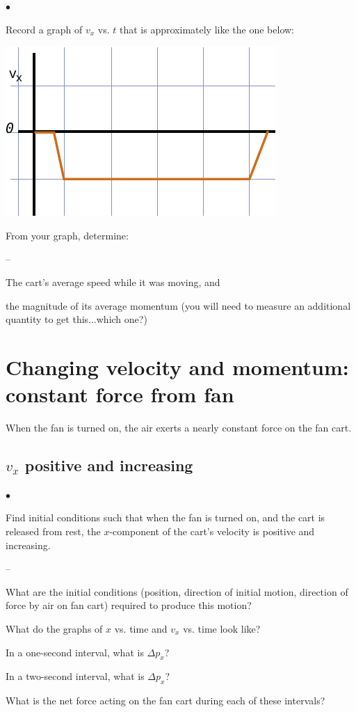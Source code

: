 \documentclass[11pt]{article}
\newcommand{\squishlist}{
   \begin{list}{$\bullet$}
    { \setlength{\itemsep}{0pt}      \setlength{\parsep}{3pt}
      \setlength{\topsep}{3pt}       \setlength{\partopsep}{0pt}
      \setlength{\leftmargin}{1.5em} \setlength{\labelwidth}{1em}
      \setlength{\labelsep}{0.5em} } }
\newcommand{\squishlistB}{
   \begin{list}{--}
    { \setlength{\itemsep}{0pt}      \setlength{\parsep}{3pt}
      \setlength{\topsep}{3pt}       \setlength{\partopsep}{0pt}
      \setlength{\leftmargin}{1.5em} \setlength{\labelwidth}{1em}
      \setlength{\labelsep}{0.5em} } }
\newcommand{\squishend}{
    \end{list}  }
\begin{document}
\squishlist
\item Record a graph of $v_{x}$ vs. $t$ that is approximately like the one below:

\begin{center}
\vspace{10pt}
\includegraphics{vx_neg_const.pdf}
\end{center}

\item From your graph, determine:
\squishlistB
\item The cart's average speed while it was moving, and 
\item the magnitude of its average momentum (you will need to measure an additional quantity to get this...which one?) 
\squishend
\squishend

\newpage

\section{Changing velocity and momentum: constant force from fan}

When the fan is turned on, the air exerts a nearly constant force on the
fan cart.

\subsection{$v_x$ positive and increasing}


\squishlist

\item Find initial conditions such that when the fan is turned on, and the cart is
released from rest, the $x$-component of the cart's velocity is positive and
increasing.

\squishlistB
\item What are the initial conditions (position, direction of initial motion, direction of force by air on fan cart) required to produce this motion?
\item What do the graphs of $x$ vs. time and $v_x$ vs. time look like?
\item In a one-second interval, what is $\Delta p_x$?
\item In a two-second interval, what is $\Delta p_x$?
\item What is the net force acting on the fan cart during each of these intervals?
\squishend
\squishend
\end{document}
